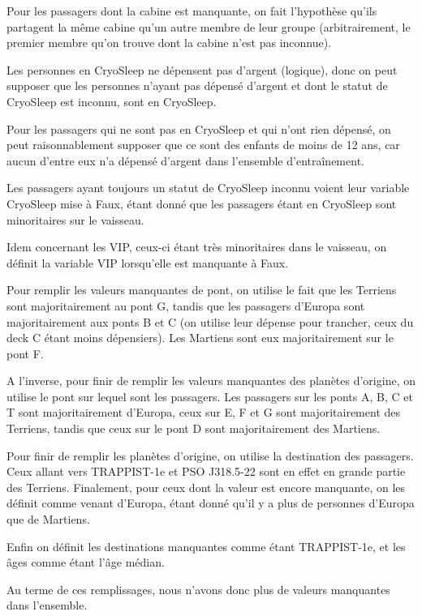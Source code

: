 \documentclass[a4paper]{article}
\begin{document}
    Pour les passagers dont la cabine est manquante, on fait l'hypothèse qu'ils partagent la même cabine qu'un autre
    membre de leur groupe (arbitrairement, le premier membre qu'on trouve dont la cabine n'est pas inconnue).

    Les personnes en CryoSleep ne dépensent pas d'argent (logique), donc on peut supposer que les personnes
    n'ayant pas dépensé d'argent et dont le statut de CryoSleep est inconnu, sont en CryoSleep.

    Pour les passagers qui ne sont pas en CryoSleep et qui n'ont rien dépensé, on peut raisonnablement supposer que ce sont des enfants
    de moins de 12 ans, car aucun d'entre eux n'a dépensé d'argent dans l'ensemble d'entraînement.

    Les passagers ayant toujours un statut de CryoSleep inconnu voient leur variable CryoSleep mise à Faux,
    étant donné que les passagers étant en CryoSleep sont minoritaires sur le vaisseau.

    Idem concernant les VIP, ceux-ci étant très minoritaires dans le vaisseau, on définit la variable VIP lorsqu'elle est manquante à Faux.

    Pour remplir les valeurs manquantes de pont, on utilise le fait que les Terriens sont majoritairement au pont G,
    tandis que les passagers d'Europa sont majoritairement aux ponts B et C (on utilise leur dépense pour trancher, ceux du deck C étant moins dépensiers).
    Les Martiens sont eux majoritairement sur le pont F.

    A l'inverse, pour finir de remplir les valeurs manquantes des planètes d'origine, on utilise le pont sur lequel sont les passagers.
    Les passagers sur les ponts A, B, C et T sont majoritairement d'Europa, ceux sur E, F et G sont majoritairement des Terriens, tandis que
    ceux sur le pont D sont majoritairement des Martiens.

    Pour finir de remplir les planètes d'origine, on utilise la destination des passagers.
    Ceux allant vers TRAPPIST-1e et PSO J318.5-22 sont en effet en grande partie des Terriens.
    Finalement, pour ceux dont la valeur est encore manquante, on les définit comme venant d'Europa,
    étant donné qu'il y a plus de personnes d'Europa que de Martiens.

    Enfin on définit les destinations manquantes comme étant TRAPPIST-1e, et les âges comme étant l'âge médian.

    Au terme de ces remplissages, nous n'avons donc plus de valeurs manquantes dans l'ensemble.
\end{document}
